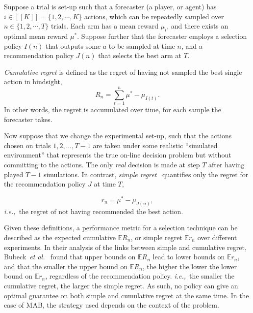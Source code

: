 \documentclass[a4paper]{llncs}
\newcommand{\ie}{{\it i.e.,}~}
\newcommand{\bE}{\mathbb{E}}
\begin{document}
Suppose a trial is set-up such that a forecaster (a player, or agent) has $i \in [[K]] = \{1, 2, \cdots, K \}$ actions, which can be repeatedly sampled over $n \in \{ 1, 2, \cdots, T \}$ trials. 
Each arm has a mean reward $\mu_i$, and there exists an optimal mean reward $\mu^*$. 
Suppose further that the forecaster employs a selection policy $I(n)$ that outputs some $a$ to be sampled at time $n$, and a recommendation policy $J(n)$ that selects the best arm at $T$.

\emph{Cumulative regret} is defined as the regret of having not sampled the best single action in hindsight, 
\begin{equation}
R_n = \sum_{t = 1}^{n}{\mu^* - \mu_{I(t)}}.
\end{equation}
In other words, the regret is accumulated over time, for each sample the forecaster takes.

Now suppose that we change the experimental set-up, such that the actions chosen on trials $1, 2, \ldots, T-1$ are taken under some realistic ``simulated environment'' that represents the true on-line decision problem but without committing to the actions. The only \emph{real} decision is made at step $T$ after having played $T-1$ simulations. In contrast, \emph{simple regret}~\cite{Bubeck11Pure} quantifies only the regret for the recommendation policy $J$ at time $T$,

\begin{equation}
r_n = \mu^* - \mu_{J(n)},
\end{equation}
\ie the regret of not having recommended the best action.

Given these definitions, a performance metric for a selection technique can be described as the expected cumulative $\bE R_n$, or simple regret $\bE r_n$ over different experiments. In their analysis of the links between simple and cumulative regret, Bubeck~\emph{et al.}~\cite{Bubeck11Pure} found that upper bounds on $\bE R_n$ lead to lower bounds on $\bE r_n$, and that the smaller the upper bound on $\bE R_n$, the higher the lower the lower bound on $\bE r_n$, regardless of the recommendation policy. \ie the smaller the cumulative regret, the larger the simple regret. As such, no policy can give an optimal guarantee on both simple and cumulative regret at the same time. In the case of MAB, the strategy used depends on the context of the problem.
\end{document}
